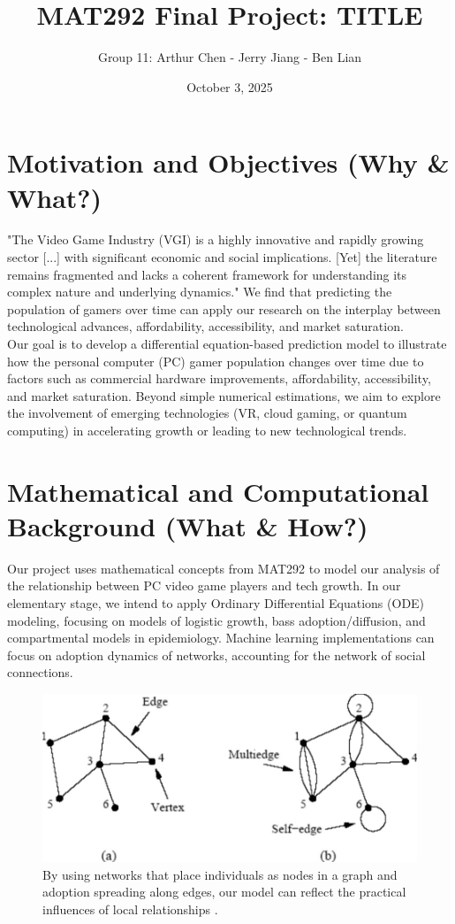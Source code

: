 \documentclass{article}
\title{\vspace{-2cm}MAT292 Final Project: TITLE}
\author{Group 11: Arthur Chen - Jerry Jiang - Ben Lian}
\date{October 3, 2025}
\begin{document}
\maketitle

\section{Motivation and Objectives (Why \& What?)}
"The Video Game Industry (VGI) is a highly innovative and rapidly growing sector [...] with significant economic and social implications. [Yet] the literature remains fragmented and lacks a coherent framework for understanding its complex nature and underlying dynamics." \cite{GOH2023100100} We find that predicting the population of gamers over time can apply our research on the interplay between technological advances, affordability, accessibility, and market saturation.\\

\noindent Our goal is to develop a differential equation-based prediction model to illustrate how the personal computer (PC) gamer population changes over time due to factors such as commercial hardware improvements, affordability, accessibility, and market saturation. Beyond simple numerical estimations, we aim to explore the involvement of emerging technologies (VR, cloud gaming, or quantum computing) in accelerating growth or leading to new technological trends.

\section{Mathematical and Computational Background (What \& How?)}
Our project uses mathematical concepts from MAT292 to model our analysis of the relationship between PC video game players and tech growth. In our elementary stage, we intend to apply Ordinary Differential Equations (ODE) modeling, focusing on models of logistic growth, bass adoption/diffusion, and compartmental models in epidemiology. Machine learning implementations can focus on adoption dynamics of networks, accounting for the network of social connections. 

\begin{figure} [H]
    \centering
    \includegraphics[width=0.5\linewidth]{Image.jpeg}
    \caption{By using networks that place individuals as nodes in a graph and adoption spreading along edges, our model can reflect the practical influences of local relationships \cite{10.1093/acprof:oso/9780199206650.003.0006}.}
    \label{fig:GraphNodeFigure}
\end{figure}
\end{document}

